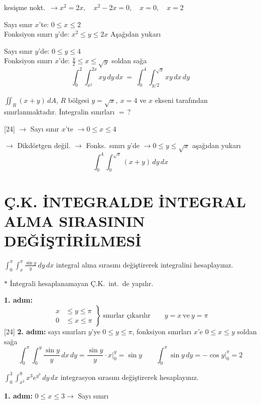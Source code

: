 \documentclass[11pt,a4paper]{article}
\begin{document}
kesişme nokt.\ $\longrightarrow x^2=2x,\quad x^2-2x=0,\quad x=0,\quad x=2$

\noindent Sayı sınır $x$'te: $0\le x\le 2$\\
Fonksiyon sınırı $y$'de: $x^2\le y\le 2x$ \quad Aşağıdan yukarı

\noindent Sayı sınır $y$'de: $0\le y\le 4$\\
Fonksiyon sınırı $x$'de: $\frac y2\le x\le\sqrt y$ \quad soldan sağa
\[ \int_0^2\!\!\int_{x^2}^{2x} xy\,dy\,dx\ =\ \int_0^4\!\!\int_{y/2}^{\sqrt y} xy\,dx\,dy \]

\begin{ornek}
$\displaystyle\iint_R (x+y)\,dA$, $R$ bölgesi $y=\sqrt x,\ x=4$ ve $x$ ekseni tarafından sınırlanmaktadır. İntegralin sınırları $=\,?$
\end{ornek}
[24]
\noindent$\to$ Sayı sınır $x$'te $\to 0\le x\le 4$

\noindent$\to$ Dikdörtgen değil. $\to$ Fonks.\ sınırı $y$'de $\to 0\le y\le\sqrt x$ \quad aşağıdan yukarı
\[ \int_0^4\!\!\int_0^{\sqrt x}(x+y)\,dy\,dx \]

\section{Ç.K. İNTEGRALDE İNTEGRAL ALMA SIRASININ DEĞİŞTİRİLMESİ}
\begin{ornek}
$\displaystyle\int_0^\pi\!\!\int_x^\pi \frac{\sin y}{y}\,dy\,dx$ integral alma sırasını değiştirerek integralini hesaplayınız.
\end{ornek}
$*$ İntegrali hesaplanamayan Ç.K.\ int.\ de yapılır.

\noindent\textbf{1. adım:}
\[ \left.\begin{aligned} x&\le y\le\pi\\ 0&\le x\le\pi\end{aligned}\right\}\ \text{sınırlar çıkarılır}\qquad y=x\ \text{ve}\ y=\pi \]
[24]
\noindent\textbf{2. adım:} sayı sınırları $y$'ye $0\le y\le\pi$, fonksiyon sınırları $x$'e $0\le x\le y$ soldan sağa
\[ \int_0^\pi\!\!\int_0^y\frac{\sin y}{y}\,dx\,dy=\frac{\sin y}{y}\cdot x\Big|_0^y=\sin y\qquad \int_0^\pi\sin y\,dy=-\cos y\Big|_0^\pi=2 \]

\begin{ornek}
$\displaystyle\int_0^3\!\!\int_{x^2}^{9}x^3e^{y^3}\,dy\,dx$ integrasyon sırasını değiştirerek hesaplayınız.
\end{ornek}
\noindent\textbf{1. adım:} $0\le x\le 3\to$ Sayı sınırı
\end{document}
